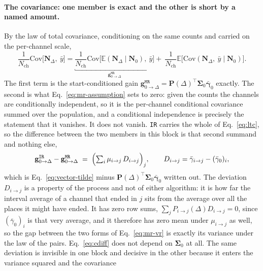 \begin{appendixbox}
\paragraph{The covariance: one member is exact and the other is short by a named amount.}
By the law of total covariance, conditioning on the same counts and carried on the per-channel
scale,
\begin{equation}
  \frac{1}{N_{\mathrm{ch}}}\mathrm{Cov}\bigl[\mathbf{N}_\Delta,\ \bar y\bigr]
  = \underbracket{\frac{1}{N_{\mathrm{ch}}}\mathrm{Cov}\bigl[\mathbb{E}(\mathbf{N}_\Delta\mid \mathbf{N}_0),\ \bar y\bigr]}_{\textstyle \mathbf{g}^{\mathtt{MR}}_{0\to\Delta}}
  + \ \frac{1}{N_{\mathrm{ch}}}\mathbb{E}\bigl[\mathrm{Cov}(\mathbf{N}_\Delta,\ \bar y \mid \mathbf{N}_0)\bigr] .
  \label{eq:ltc}
\end{equation}
The first term is the start-conditioned gain
$\mathbf{g}^{\mathtt{MR}}_{0\to\Delta}=\mathbf{P}(\Delta)^\top\boldsymbol{\Sigma}_0\bar{\boldsymbol{\gamma}}_0$ exactly. The
second is what Eq.~\ref{eq:mr-assumption} sets to zero: given the counts the channels are
conditionally independent, so it is the per-channel conditional covariance summed over the
population, and a conditional independence is precisely the statement that it vanishes. It does not
vanish. \texttt{IR} carries the whole of Eq.~\ref{eq:ltc}, so the difference between the two
members in this block is that second summand and nothing else,
\begin{equation}
  \mathbf{g}^{\mathtt{IR}}_{0\to\Delta}-\mathbf{g}^{\mathtt{MR}}_{0\to\Delta}
  \;=\;\Bigl(\textstyle\sum_{i}\mu_{i\to j}\,D_{i\to j}\Bigr)_{j},
  \qquad
  D_{i\to j}=\bar{\gamma}_{i\to j}-(\bar\gamma_0)_{i} ,
  \label{eq:cdiff}
\end{equation}
which is Eq.~\ref{eq:vector-tilde} minus $\mathbf{P}(\Delta)^\top\boldsymbol{\Sigma}_0\bar{\boldsymbol{\gamma}}_0$
written out. The deviation $D_{i\to j}$ is a property of the process and not of either
algorithm: it is how far the interval average of a channel that ended in $j$ sits from the
average over all the places it might have ended. It has zero row sums,
$\sum_{j}P_{i\to j}(\Delta)D_{i\to j}=0$, since $(\bar\gamma_0)_{i}$ is that very
average, and it therefore has zero mean under $\mu_{i\to j}$ as well, so the gap between the
two forms of Eq.~\ref{eq:mr-vr} is exactly its variance under the law of the pairs.
Eq.~\ref{eq:cdiff} does not depend on $\boldsymbol{\Sigma}_0$ at all. The same deviation is invisible in
one block and decisive in the other because it enters the variance squared and the covariance

\end{appendixbox}
